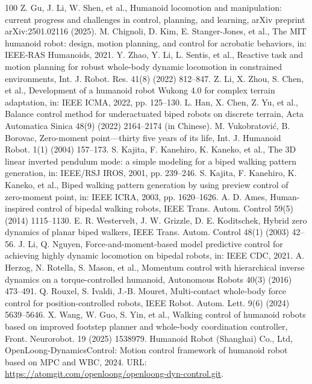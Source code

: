 \documentclass[5p,times]{elsarticle}
\begin{document}
\begin{thebibliography}{100}
 Z. Gu, J. Li, W. Shen, et al., Humanoid locomotion and manipulation: current progress and challenges in control, planning, and learning, arXiv preprint arXiv:2501.02116 (2025).
 M. Chignoli, D. Kim, E. Stanger-Jones, et al., The MIT humanoid robot: design, motion planning, and control for acrobatic behaviors, in: IEEE-RAS Humanoids, 2021.
 Y. Zhao, Y. Li, L. Sentis, et al., Reactive task and motion planning for robust whole-body dynamic locomotion in constrained environments, Int. J. Robot. Res. 41(8) (2022) 812--847.
 Z. Li, X. Zhou, S. Chen, et al., Development of a humanoid robot Wukong 4.0 for complex terrain adaptation, in: IEEE ICMA, 2022, pp. 125--130.
 L. Han, X. Chen, Z. Yu, et al., Balance control method for underactuated biped robots on discrete terrain, Acta Automatica Sinica 48(9) (2022) 2164--2174 (in Chinese).
 M. Vukobratovi\'{c}, B. Borovac, Zero-moment point---thirty five years of its life, Int. J. Humanoid Robot. 1(1) (2004) 157--173.
 S. Kajita, F. Kanehiro, K. Kaneko, et al., The 3D linear inverted pendulum mode: a simple modeling for a biped walking pattern generation, in: IEEE/RSJ IROS, 2001, pp. 239--246.
 S. Kajita, F. Kanehiro, K. Kaneko, et al., Biped walking pattern generation by using preview control of zero-moment point, in: IEEE ICRA, 2003, pp. 1620--1626.
 A. D. Ames, Human-inspired control of bipedal walking robots, IEEE Trans. Autom. Control 59(5) (2014) 1115--1130.
 E. R. Westervelt, J. W. Grizzle, D. E. Koditschek, Hybrid zero dynamics of planar biped walkers, IEEE Trans. Autom. Control 48(1) (2003) 42--56.
 J. Li, Q. Nguyen, Force-and-moment-based model predictive control for achieving highly dynamic locomotion on bipedal robots, in: IEEE CDC, 2021.
 A. Herzog, N. Rotella, S. Mason, et al., Momentum control with hierarchical inverse dynamics on a torque-controlled humanoid, Autonomous Robots 40(3) (2016) 473--491.
 Q. Rouxel, S. Ivaldi, J.-B. Mouret, Multi-contact whole-body force control for position-controlled robots, IEEE Robot. Autom. Lett. 9(6) (2024) 5639--5646.
 X. Wang, W. Guo, S. Yin, et al., Walking control of humanoid robots based on improved footstep planner and whole-body coordination controller, Front. Neurorobot. 19 (2025) 1538979.
 Humanoid Robot (Shanghai) Co., Ltd, OpenLoong-DynamicsControl: Motion control framework of humanoid robot based on MPC and WBC, 2024. URL: \url{https://atomgit.com/openloong/openloong-dyn-control.git}.

\end{thebibliography}
\end{document}
